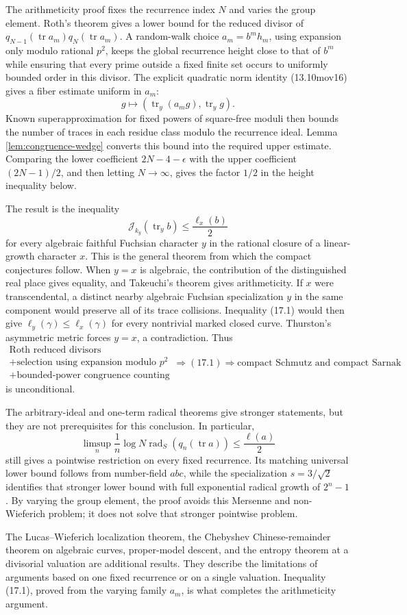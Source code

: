 \documentclass[11pt,reqno]{amsart}
\theoremstyle{definition}
\theoremstyle{remark}
\newcommand{\Tr}{\operatorname{tr}}
\begin{document}
The arithmeticity proof fixes the recurrence index \(N\) and varies the
group element.  Roth's theorem gives a lower bound for the reduced divisor of
\(q_{N-1}(\Tr a_m)q_N(\Tr a_m)\).  A random-walk choice
\(a_m=b^mh_m\), using expansion only modulo rational \(p^2\), keeps the
global recurrence height close to that of \(b^m\) while ensuring that every
prime outside a fixed finite set occurs to uniformly bounded order in this
divisor.  The explicit
quadratic norm identity (13.10mov16) gives a fiber estimate uniform in
\(a_m\):
\[
 g\longmapsto(\Tr_y(a_mg),\Tr_yg).
\]
Known superapproximation for fixed powers of square-free moduli then bounds the number of traces in
each residue class modulo the recurrence ideal.  Lemma
\ref{lem:congruence-wedge} converts this bound into the required upper
estimate.  Comparing the lower coefficient \(2N-4-\epsilon\) with the upper
coefficient \((2N-1)/2\), and then letting \(N\to\infty\), gives the factor
\(1/2\) in the height inequality below.

The result is the inequality
\[
 \mathcal J_{k_y}(\Tr_yb)\le\frac{\ell_x(b)}2
\tag{17.1}
\]
for every algebraic faithful Fuchsian character \(y\) in the rational
closure of a linear-growth character \(x\).  This is the general theorem
from which the compact conjectures follow.  When \(y=x\) is algebraic, the
contribution of the distinguished real place gives equality, and Takeuchi's theorem
\cite{Takeuchi} gives
arithmeticity.  If \(x\) were transcendental, a distinct nearby algebraic
Fuchsian specialization \(y\) in the same component would preserve all of
its trace collisions.  Inequality (17.1) would then give
\(\ell_y(\gamma)\le\ell_x(\gamma)\) for every nontrivial marked closed
curve.  Thurston's asymmetric metric \cite{ThurstonStretch} forces
\(y=x\), a contradiction.  Thus
\[
 \substack{\text{Roth reduced divisors}\\
           +\text{selection using expansion modulo }p^2\\
           +\text{bounded-power congruence counting}}
 \Longrightarrow (17.1)
 \Longrightarrow
 \text{compact Schmutz and compact Sarnak}
\]
is unconditional.

The arbitrary-ideal and one-term radical theorems give stronger statements,
but they are not prerequisites for this conclusion.  In
particular,
\[
 \limsup_n\frac1n
 \log N\operatorname{rad}_S(q_n(\Tr a))
 \le\frac{\ell(a)}2
\]
still gives a pointwise restriction on every fixed recurrence.  Its
matching universal lower bound follows from number-field \(abc\), while
the specialization \(s=3/\sqrt2\) identifies that stronger lower bound
with full exponential radical growth of \(2^n-1\).  By varying the group
element, the proof avoids this Mersenne and non-Wieferich problem; it does
not solve that stronger pointwise problem.

The Lucas--Wieferich localization theorem, the Chebyshev
Chinese-remainder theorem on algebraic curves, proper-model descent, and
the entropy theorem at a divisorial valuation are additional results.  They describe
the limitations of arguments based on one fixed recurrence or on a single
valuation.  Inequality (17.1), proved from the varying family \(a_m\), is
what completes the arithmeticity argument.



\end{document}
